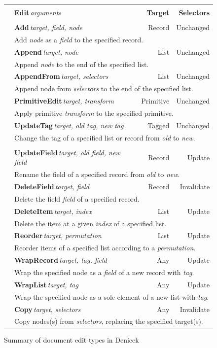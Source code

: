 \documentclass[sigconf,anonymous,screen]{acmart}
\begin{document}

\begin{figure}
\newcommand{\ektablecol}[6]{
\raisebox{-0.2em}{#1} & \sffamily\small{\bfseries #2}\,\;\textit{\footnotesize target, #3} & \sffamily\footnotesize #4 & \sffamily\footnotesize #5 \\[-0.2em]
&\multicolumn{3}{l|}{\sffamily\footnotesize #6}\\[0.3em]
}
\begin{tabular}{|cp{13em}rr|}
\hline
\rowcolor{ekgray}
&&&\\[-1em]
\rowcolor{ekgray}
 & \sffamily\small{\bfseries Edit}\;\,\textit{\footnotesize arguments} & \sffamily\footnotesize\bfseries Target & \sffamily\footnotesize\bfseries Selectors \\[0.2em]
\hline
&&&\\[-1em]
\ektablecol{\faPlus}{Add}{field, node}{Record}{Unchanged}
  {Add \textit{node} as a \textit{field} to the specified record.}
\ektablecol{\faAt}{Append}{node}{List}{Unchanged}
  {Append \textit{node} to the end of the specified list.}
\ektablecol{\faPaperclip}{AppendFrom}{selectors}{List}{Unchanged}
  {Append node from \emph{selectors} to the end of the specified list.}
\ektablecol{\faICursor}{PrimitiveEdit}{transform}{Primitive}{Unchanged}
  {Apply primitive \textit{transform} to the specified primitive.}
\ektablecol{\faCode}{UpdateTag}{old tag, new tag}{Tagged}{Unchanged}
  {Change the tag of a specified list or record from \textit{old} to \textit{new}.}
\hline
&&&\\[-1em]
\ektablecol{\faFont}{UpdateField}{old field, new field}{Record}{Update}
  {Rename the field of a specified record from \textit{old} to \textit{new}.}
\ektablecol{\faTimesCircle}{DeleteField}{field}{Record}{Invalidate}
  {Delete the field \textit{field} of a specified record.}
\ektablecol{\faMinusCircle}{DeleteItem}{index}{List}{Update}
  {Delete the item at a given \textit{index} of a specified list.}
\ektablecol{\faSort}{Reorder}{permutation}{List}{Update}
  {Reorder items of a specified list according to a \textit{permutation}.}
\ektablecol{\faFileO}{WrapRecord}{tag, field}{Any}{Update}
  {Wrap the specified node as a \textit{field} of a new record with \textit{tag}.}
\ektablecol{\faListUl}{WrapList}{tag}{Any}{Update}
  {Wrap the specified node as a sole element of a new list with \textit{tag}.}
\ektablecol{\faCopy}{Copy}{selectors}{Any}{Invalidate}
  {Copy nodes(s) from \textit{selectors}, replacing the specified target(s). }
\hline
\end{tabular}
\vspace{-0.5em}
\caption{Summary of document edit types in Denicek}
\label{fig:edits}
\vspace{-1em}
\end{figure}
\end{document}
